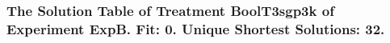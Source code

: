  \begin{frame}
 \fontsize{8pt}{9pt}\selectfont
 \frametitle{ The Solution Table of Treatment BoolT3sgp3k of Experiment ExpB. Fit: 0. Unique Shortest Solutions: 32. }

 \label{ExpBSolutionTable016.tex}  
 \end{frame}


